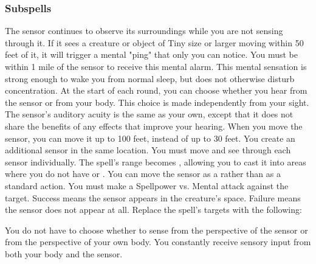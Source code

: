 \subsubsection{Subspells}
The sensor continues to observe its surroundings while you are not sensing through it.
If it sees a creature or object of Tiny size or larger moving within 50 feet of it, it will trigger a mental "ping" that only you can notice.
You must be within 1 mile of the sensor to receive this mental alarm.
This mental sensation is strong enough to wake you from normal sleep, but does not otherwise disturb concentration.
At the start of each round, you can choose whether you hear from the sensor or from your body.
This choice is made independently from your sight.
The sensor's auditory acuity is the same as your own, except that it does not share the benefits of any  effects that improve your hearing.
When you move the sensor, you can move it up to 100 feet, instead of up to 30 feet.
You create an additional sensor in the same location.
You must move and see through each sensor individually.
The spell's range becomes \rngunrestricted, allowing you to cast it into areas where you do not have  or .
You can move the sensor as a  rather than as a standard action.
You must make a Spellpower vs. Mental attack against the target.
Success means the sensor appears in the creature's space.
Failure means the sensor does not appear at all.
Replace the spell's targets with the following:
\begin{spellcontent}
\begin{augmenttargetinginfo}
\end{augmenttargetinginfo}
\end{spellcontent}
You do not have to choose whether to sense from the perspective of the sensor or from the perspective of your own body.
You constantly receive sensory input from both your body and the sensor.
